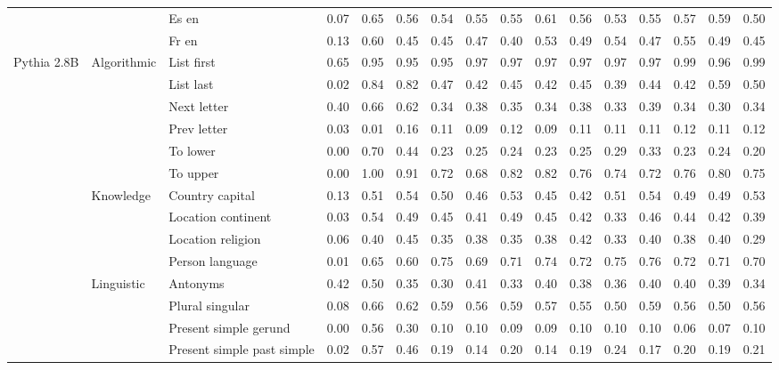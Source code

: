 \begin{center}
\begin{longtable}{lllrrrrrrrrrrrrr}
 &  & Es en & 0.07 & 0.65 & 0.56 & 0.54 & 0.55 & 0.55 & 0.61 & 0.56 & 0.53 & 0.55 & 0.57 & 0.59 & 0.50 \\
 &  & Fr en & 0.13 & 0.60 & 0.45 & 0.45 & 0.47 & 0.40 & 0.53 & 0.49 & 0.54 & 0.47 & 0.55 & 0.49 & 0.45 \\
\cline{1-16} \cline{2-16}
\multirow[t]{18}{*}{Pythia 2.8B} & \multirow[t]{6}{*}{Algorithmic} & List first & 0.65 & 0.95 & 0.95 & 0.95 & 0.97 & 0.97 & 0.97 & 0.97 & 0.97 & 0.97 & 0.99 & 0.96 & 0.99 \\
 &  & List last & 0.02 & 0.84 & 0.82 & 0.47 & 0.42 & 0.45 & 0.42 & 0.45 & 0.39 & 0.44 & 0.42 & 0.59 & 0.50 \\
 &  & Next letter & 0.40 & 0.66 & 0.62 & 0.34 & 0.38 & 0.35 & 0.34 & 0.38 & 0.33 & 0.39 & 0.34 & 0.30 & 0.34 \\
 &  & Prev letter & 0.03 & 0.01 & 0.16 & 0.11 & 0.09 & 0.12 & 0.09 & 0.11 & 0.11 & 0.11 & 0.12 & 0.11 & 0.12 \\
 &  & To lower & 0.00 & 0.70 & 0.44 & 0.23 & 0.25 & 0.24 & 0.23 & 0.25 & 0.29 & 0.33 & 0.23 & 0.24 & 0.20 \\
 &  & To upper & 0.00 & 1.00 & 0.91 & 0.72 & 0.68 & 0.82 & 0.82 & 0.76 & 0.74 & 0.72 & 0.76 & 0.80 & 0.75 \\
\cline{2-16}
 & \multirow[t]{4}{*}{Knowledge} & Country capital & 0.13 & 0.51 & 0.54 & 0.50 & 0.46 & 0.53 & 0.45 & 0.42 & 0.51 & 0.54 & 0.49 & 0.49 & 0.53 \\
 &  & Location continent & 0.03 & 0.54 & 0.49 & 0.45 & 0.41 & 0.49 & 0.45 & 0.42 & 0.33 & 0.46 & 0.44 & 0.42 & 0.39 \\
 &  & Location religion & 0.06 & 0.40 & 0.45 & 0.35 & 0.38 & 0.35 & 0.38 & 0.42 & 0.33 & 0.40 & 0.38 & 0.40 & 0.29 \\
 &  & Person language & 0.01 & 0.65 & 0.60 & 0.75 & 0.69 & 0.71 & 0.74 & 0.72 & 0.75 & 0.76 & 0.72 & 0.71 & 0.70 \\
\cline{2-16}
 & \multirow[t]{4}{*}{Linguistic} & Antonyms & 0.42 & 0.50 & 0.35 & 0.30 & 0.41 & 0.33 & 0.40 & 0.38 & 0.36 & 0.40 & 0.40 & 0.39 & 0.34 \\
 &  & Plural singular & 0.08 & 0.66 & 0.62 & 0.59 & 0.56 & 0.59 & 0.57 & 0.55 & 0.50 & 0.59 & 0.56 & 0.50 & 0.56 \\
 &  & Present simple gerund & 0.00 & 0.56 & 0.30 & 0.10 & 0.10 & 0.09 & 0.09 & 0.10 & 0.10 & 0.10 & 0.06 & 0.07 & 0.10 \\
 &  & Present simple past simple & 0.02 & 0.57 & 0.46 & 0.19 & 0.14 & 0.20 & 0.14 & 0.19 & 0.24 & 0.17 & 0.20 & 0.19 & 0.21 \\

\end{longtable}
\end{center}
